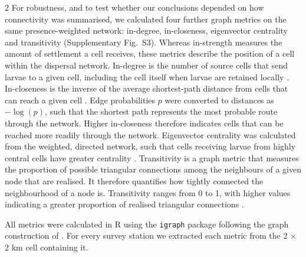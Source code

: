 \begin{spacing}{2}
For robustness, and to test whether our conclusions depended on how connectivity was summarised, we calculated four further graph metrics on the same presence-weighted network: in-degree, in-closeness, eigenvector centrality and transitivity (Supplementary Fig.~S3). Whereas in-strength measures the amount of settlement a cell receives, these metrics describe the position of a cell within the dispersal network. In-degree is the number of source cells that send larvae to a given cell, including the cell itself when larvae are retained locally \citep{freemanCentralitySocialNetworks1978}. In-closeness is the inverse of the average shortest-path distance from cells that can reach a given cell \citep{estradaUSINGNETWORKCENTRALITY2008}. Edge probabilities $p$ were converted to distances as $-\log(p)$, such that the shortest path represents the most probable route through the network. Higher in-closeness therefore indicates cells that can be reached more readily through the network. Eigenvector centrality was calculated from the weighted, directed network, such that cells receiving larvae from highly central cells have greater centrality \citep{bonacichPowerCentralityFamily1987}. Transitivity is a graph metric that measures the proportion of possible triangular connections among the neighbours of a given node that are realised. It therefore quantifies how tightly connected the neighbourhood of a node is. Transitivity ranges from 0 to 1, with higher values indicating a greater proportion of realised triangular connections \citep{hansenAssessingDemographicConnectivity2024}.

All metrics were calculated in R using the \texttt{igraph} package \citep{csardi2006} following the graph construction of \citet{hansenAssessingDemographicConnectivity2024}. For every survey station we extracted each metric from the 2 × 2 km cell containing it.




\end{spacing}
